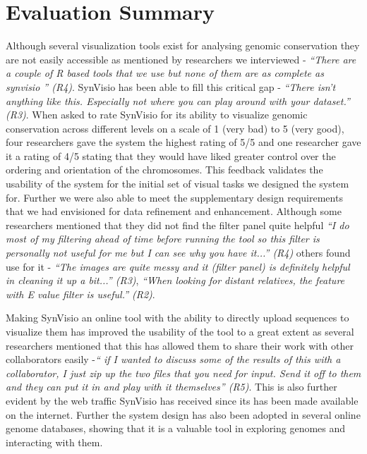 \section{Evaluation Summary}  
Although several visualization tools exist for analysing genomic conservation they are not easily accessible as mentioned by researchers we interviewed -  \textit{``There are a couple of R based tools that we use but none of them are as complete as synvisio '' (R4)}. SynVisio has been able to fill this critical gap - \textit{``There isn't anything like this. Especially not where you can play around with your dataset.'' (R3)}. When asked to rate SynVisio for its ability to visualize genomic conservation across different levels on a scale of 1 (very bad) to 5 (very good), four researchers gave the system the highest rating of 5/5 and one researcher gave it a rating of 4/5 stating that they would have liked greater control over the ordering and orientation of the chromosomes. This feedback validates the usability of the system for the initial set of visual tasks we designed the system for. Further we were also able to meet the supplementary design requirements that we had envisioned for data refinement and enhancement. Although some researchers mentioned that they did not find the filter panel quite helpful \textit{``I do most of my filtering ahead of time before running the tool so this filter is personally not useful for me but I can see why you have it...'' (R4)} others found use for it - \textit{``The images are quite messy and it (filter panel) is definitely helpful in cleaning it up a bit...'' (R3)}, \textit{``When looking for distant relatives, the feature with E value filter is useful.'' (R2)}. 
 
Making SynVisio an online tool with the ability to directly upload sequences to visualize them has improved the usability of the tool to a great extent as several researchers mentioned that this has allowed them to share their work with other collaborators easily -\textit{`` if I wanted to discuss some of the results of this with a collaborator, I just zip up the two files that you need for input. Send it off to them and they can put it in and play with it themselves'' (R5)}. This is also further evident by the web traffic SynVisio has received since its has been made available on the internet. Further the system design has also been adopted in several online genome databases, showing that it is a valuable tool in exploring genomes and interacting with them.



